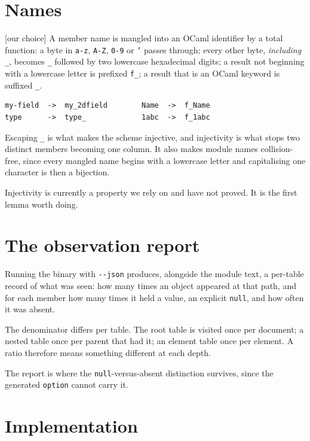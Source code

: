 \documentclass[11pt,a4paper]{article}
\newcommand{\ourcall}{\textcolor{ours}{\textsf{[our choice]}}}
\begin{document}
\section{Names}

\ourcall{} A member name is mangled into an OCaml identifier by a total
function: a byte in \texttt{a-z}, \texttt{A-Z}, \texttt{0-9} or \texttt{'}
passes through; every other byte, \emph{including} \texttt{\_}, becomes
\texttt{\_} followed by two lowercase hexadecimal digits; a result not
beginning with a lowercase letter is prefixed \texttt{f\_}; a result that is
an OCaml keyword is suffixed \texttt{\_}.

\begin{lstlisting}[style=json]
my-field  ->  my_2dfield        Name  ->  f_Name
type      ->  type_             1abc  ->  f_1abc
\end{lstlisting}

Escaping \texttt{\_} is what makes the scheme injective, and injectivity is
what stops two distinct members becoming one column. It also makes module
names collision-free, since every mangled name begins with a lowercase letter
and capitalising one character is then a bijection.

Injectivity is currently a property we rely on and have not proved. It is the
first lemma worth doing.

\section{The observation report}\label{sec:report}

Running the binary with \texttt{-{}-json} produces, alongside the module text,
a per-table record of what was seen: how many times an object appeared at that
path, and for each member how many times it held a value, an explicit
\texttt{null}, and how often it was absent.

The denominator differs per table. The root table is visited once per
document; a nested table once per parent that had it; an element table once
per element. A ratio therefore means something different at each depth.

The report is where the \texttt{null}-versus-absent distinction survives,
since the generated \texttt{option} cannot carry it.

\section{Implementation}
\end{document}
